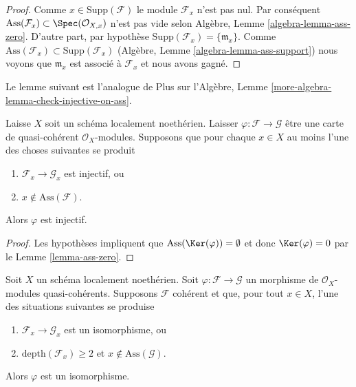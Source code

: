 \begin{proof}
Comme  $x \in \text{Supp}(\mathcal{F})$  le module  $\mathcal{F}_x$  n’est pas nul. Par conséquent
 $\text{Ass}(\mathcal{F}_x) \subset \Spec(\mathcal{O}_{X, x})$  n’est pas vide selon Algèbre, Lemme  \ref{algebra-lemma-ass-zero}. D’autre part, par
hypothèse  $\text{Supp}(\mathcal{F}_x) = \{\mathfrak m_x\}$. Comme  $\text{Ass}(\mathcal{F}_x) \subset \text{Supp}(\mathcal{F}_x)$  (Algèbre, Lemme  \ref{algebra-lemma-ass-support}) nous
voyons que  $\mathfrak m_x$  est associé à  $\mathcal{F}_x$  et nous avons gagné.
\end{proof}

\noindent
Le lemme suivant est l’analogue de Plus sur l’Algèbre, Lemme  \ref{more-algebra-lemma-check-injective-on-ass}.

\begin{lemma}
\label{lemma-check-injective-on-ass}
Laisse $X$ soit un schéma localement noethérien. Laisser $\varphi : \mathcal{F} \to \mathcal{G}$ être
une carte de quasi-cohérent $\mathcal{O}_X$-modules. Supposons que pour
chaque $x \in X$ au moins l'une des choses suivantes se produit
\begin{enumerate}
\item $\mathcal{F}_x \to \mathcal{G}_x$  est injectif, ou
\item $x \not \in \text{Ass}(\mathcal{F})$.
\end{enumerate}
Alors  $\varphi$  est injectif.
\end{lemma}

\begin{proof}
Les hypothèses impliquent que  $\text{Ass}(\Ker(\varphi)) = \emptyset$  et donc  $\Ker(\varphi) = 0$  par le Lemme
 \ref{lemma-ass-zero}.
\end{proof}

\begin{lemma}
\label{lemma-check-isomorphism-via-depth-and-ass}
Soit $X$ un schéma localement noethérien. Soit $\varphi : \mathcal{F} \to \mathcal{G}$ un
morphisme de $\mathcal{O}_X$-modules quasi-cohérents. Supposons $\mathcal{F}$ cohérent
et que, pour tout $x \in X$, l'une des situations suivantes se produise
\begin{enumerate}
\item $\mathcal{F}_x \to \mathcal{G}_x$  est un isomorphisme, ou
\item $\text{depth}(\mathcal{F}_x) \geq 2$  et  $x \not \in \text{Ass}(\mathcal{G})$.
\end{enumerate}
Alors  $\varphi$  est un isomorphisme.
\end{lemma}

